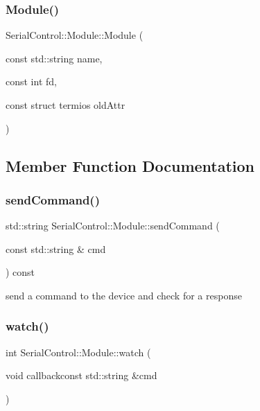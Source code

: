 \subsubsection{\texorpdfstring{Module()}{Module()}}
{\footnotesize\ttfamily Serial\+Control\+::\+Module\+::\+Module (\begin{DoxyParamCaption}\item[{const std\+::string}]{name,  }\item[{const int}]{fd,  }\item[{const struct termios}]{old\+Attr }\end{DoxyParamCaption})\hspace{0.3cm}{\ttfamily [inline]}}



\subsection{Member Function Documentation}
\mbox{\label{classSerialControl_1_1Module_a173ba39a19dc536e15e03683c5a30081}} 
\subsubsection{\texorpdfstring{sendCommand()}{sendCommand()}}
{\footnotesize\ttfamily std\+::string Serial\+Control\+::\+Module\+::send\+Command (\begin{DoxyParamCaption}\item[{const std\+::string \&}]{cmd }\end{DoxyParamCaption}) const}

send a command to the device and check for a response \mbox{\label{classSerialControl_1_1Module_a2f1390a94d7c56d8868a692e8a949c6d}} 
\subsubsection{\texorpdfstring{watch()}{watch()}}
{\footnotesize\ttfamily int Serial\+Control\+::\+Module\+::watch (\begin{DoxyParamCaption}\item[{void }]{callbackconst std\+::string \&cmd }\end{DoxyParamCaption})}

